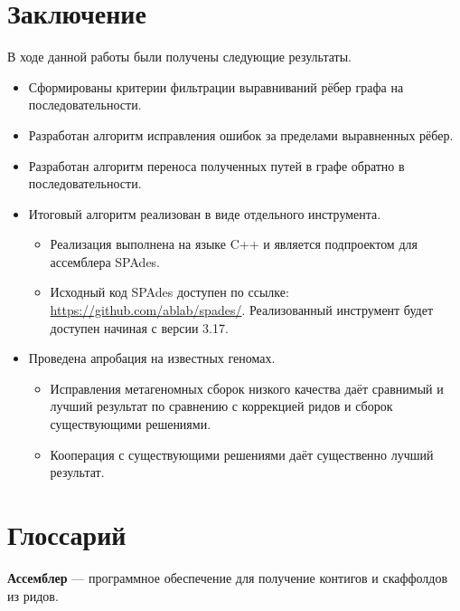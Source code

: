 \documentclass[14pt]{matmex-diploma-custom}
\begin{document}
\newpage
\section*{Заключение}
В ходе данной работы были получены следующие результаты.
\begin{itemize}
    \item Сформированы критерии фильтрации выравниваний рёбер графа на последовательности.
    \item Разработан алгоритм исправления ошибок за пределами выравненных рёбер.
    \item Разработан алгоритм переноса полученных путей в графе обратно в последовательности.
    \item Итоговый алгоритм реализован в виде отдельного инструмента.
    \begin{itemize}
        \item Реализация выполнена на языке C++ и является подпроектом для ассемблера SPAdes.
        \item \begin{sloppypar} Исходный код SPAdes доступен по ссылке: \mbox{\url{https://github.com/ablab/spades/}}. Реализованный инструмент будет доступен начиная с версии 3.17. \end{sloppypar}
    \end{itemize}
    \item Проведена апробация на известных геномах.
    \begin{itemize}
        \item Исправления метагеномных сборок низкого качества даёт сравнимый и лучший результат по сравнению с коррекцией ридов и сборок существующими решениями.
        \item Кооперация с существующими решениями даёт существенно лучший результат.
    \end{itemize}

\end{itemize}


\section*{Глоссарий}

\textbf{Ассемблер} --- программное обеспечение для получение контигов и скаффолдов из ридов.\\
\end{document}
